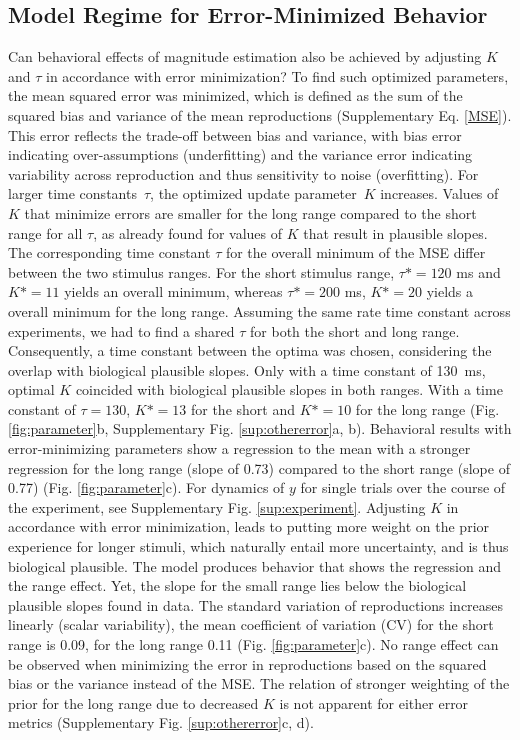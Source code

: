 \documentclass[10pt]{article}
\begin{document}
\subsection{Model Regime for Error-Minimized Behavior} %
Can behavioral effects of magnitude estimation also be achieved by adjusting $K$ and $\tau$ in accordance with error minimization?
To find such optimized parameters, the mean squared error was minimized, which is defined as the sum of the squared bias and variance of the mean reproductions (Supplementary Eq. \ref{MSE}). This error reflects the trade-off between bias and variance, with bias error indicating over-assumptions (underfitting) and the variance error indicating variability across reproduction and thus sensitivity to noise (overfitting).
For larger time constants~$\tau$, the optimized update parameter~$K$ increases. Values of $K$ that minimize errors are smaller for the long range compared to the short range for all $\tau$, as already found for values of $K$ that result in plausible slopes.
The corresponding time constant $\tau$ for the overall minimum of the MSE  differ between the two stimulus ranges. For the short stimulus range, $\tau* = 120$ ms and $K* = 11$ yields an overall minimum, whereas $\tau* = 200$ ms, $K* = 20$ yields a overall minimum for the long range. 
Assuming the same rate time constant across experiments, we had to find a shared $\tau$ for both the short and long range. Consequently, a time constant between the optima was chosen, considering the overlap with biological plausible slopes. Only with a time constant of 130~ms, optimal $K$ coincided with biological plausible slopes in both ranges. 
With a time constant of $\tau = 130$, $K* = 13$ for the short and $K* = 10$ for the long range (Fig. \ref{fig:parameter}b, Supplementary Fig. \ref{sup:othererror}a, b).
Behavioral results with error-minimizing parameters show a regression to the mean with a stronger regression for the long range (slope of 0.73) compared to the short range (slope of 0.77) (Fig. \ref{fig:parameter}c). For dynamics of $y$ for single trials over the course of the experiment, see Supplementary Fig. \ref{sup:experiment}.
Adjusting $K$ in accordance with error minimization, leads to putting more weight on the prior experience for longer stimuli, which naturally entail more uncertainty, and is thus biological plausible.
The model produces behavior that shows the regression and the range effect.
Yet, the slope for the small range lies below the biological plausible slopes found in data. 
The standard variation of reproductions increases linearly (scalar variability), the mean coefficient of variation (CV) for the short range is 0.09, for the long range 0.11 (Fig. \ref{fig:parameter}c).
No range effect can be observed when minimizing the error in reproductions based on the squared bias or the variance instead of the MSE. The relation of stronger weighting of the prior for the long range due to decreased $K$ is not apparent for either error metrics (Supplementary Fig. \ref{sup:othererror}c, d).  
\end{document}
